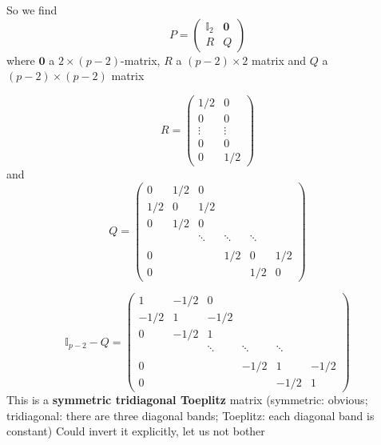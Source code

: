 \documentclass[aspectratio=169]{beamer}
\begin{document}
\begin{frame}
    So we find
    $$
    P=\begin{pmatrix}
    \mathbb{I}_2 & \mathbf{0} \\
    R & Q
    \end{pmatrix}
    $$
    where $\mathbf{0}$ a $2\times(p-2)$-matrix, $R$ a $(p-2)\times 2$ matrix and $Q$ a $(p-2)\times (p-2)$ matrix
\end{frame}


\begin{frame}
    $$
    R=
    \begin{pmatrix}
    1/2 & 0 \\
    0 & 0 \\
    \vdots & \vdots \\
    0 & 0 \\
    0 & 1/2   
    \end{pmatrix}
    $$
    and
    $$
    Q=
    \begin{pmatrix}
    0 & 1/2 & 0 & \\
    1/2 & 0 & 1/2 & \\
    0 & 1/2 & 0 & \\
    && \ddots & \ddots & \ddots \\
    &&&& \\
    0 &&& 1/2 & 0 & 1/2 \\
    0 &&&&1/2 & 0
    \end{pmatrix}
    $$
\end{frame}


\begin{frame}
    $$
    \mathbb{I}_{p-2}-Q=
    \begin{pmatrix}
    1 & -1/2 & 0 & \\
    -1/2 & 1 & -1/2 & \\
    0 & -1/2 & 1 & \\
    && \ddots & \ddots & \ddots \\
    &&&& \\
    0 &&& -1/2 & 1 & -1/2 \\
    0 &&&& -1/2 & 1
    \end{pmatrix}
    $$
    \vfill
    This is a \textbf{symmetric tridiagonal Toeplitz} matrix 
    \vfill
    (symmetric: obvious; tridiagonal: there are three diagonal bands; Toeplitz: each diagonal band is constant)
    \vfill
    Could invert it explicitly, let us not bother
\end{frame}

\end{document}
